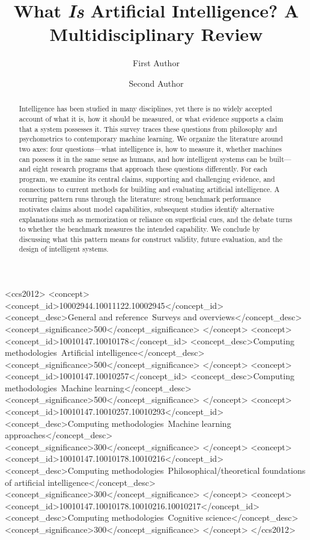 \documentclass[acmsmall,screen,review,anonymous]{acmart}
\title{What \textit{Is} Artificial Intelligence? A Multidisciplinary Review}
\author{First Author}
\affiliation{%
  \institution{University Name}
  \city{City}
  \country{Country}
}
\author{Second Author}
\affiliation{%
  \institution{University Name}
  \city{City}
  \country{Country}
}
\begin{document}
\begin{abstract}
Intelligence has been studied in many disciplines, yet there is no widely accepted account of what it is, how it should be measured, or what evidence supports a claim that a system possesses it.
%
This survey traces these questions from philosophy and psychometrics to contemporary machine learning.
%
We organize the literature around two axes: four questions---what intelligence is, how to measure it, whether machines can possess it in the same sense as humans, and how intelligent systems can be built---and eight research programs that approach these questions differently.
%
For each program, we examine its central claims, supporting and challenging evidence, and connections to current methods for building and evaluating artificial intelligence.
%
A recurring pattern runs through the literature: strong benchmark performance motivates claims about model capabilities, subsequent studies identify alternative explanations such as memorization or reliance on superficial cues, and the debate turns to whether the benchmark measures the intended capability.
%
We conclude by discussing what this pattern means for construct validity, future evaluation, and the design of intelligent systems.
\end{abstract}




\begin{CCSXML}
<ccs2012>
<concept>
<concept_id>10002944.10011122.10002945</concept_id>
<concept_desc>General and reference~Surveys and overviews</concept_desc>
<concept_significance>500</concept_significance>
</concept>
<concept>
<concept_id>10010147.10010178</concept_id>
<concept_desc>Computing methodologies~Artificial intelligence</concept_desc>
<concept_significance>500</concept_significance>
</concept>
<concept>
<concept_id>10010147.10010257</concept_id>
<concept_desc>Computing methodologies~Machine learning</concept_desc>
<concept_significance>500</concept_significance>
</concept>
<concept>
<concept_id>10010147.10010257.10010293</concept_id>
<concept_desc>Computing methodologies~Machine learning approaches</concept_desc>
<concept_significance>300</concept_significance>
</concept>
<concept>
<concept_id>10010147.10010178.10010216</concept_id>
<concept_desc>Computing methodologies~Philosophical/theoretical foundations of artificial intelligence</concept_desc>
<concept_significance>300</concept_significance>
</concept>
<concept>
<concept_id>10010147.10010178.10010216.10010217</concept_id>
<concept_desc>Computing methodologies~Cognitive science</concept_desc>
<concept_significance>300</concept_significance>
</concept>
</ccs2012>
\end{CCSXML}
\end{document}

